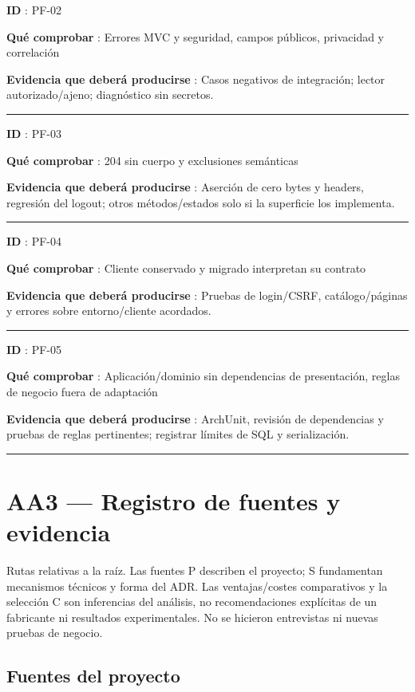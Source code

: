 \documentclass[12pt,a4paper]{report}
\begin{document}
\textbf{ID }: PF-02

\textbf{Qué comprobar }: Errores MVC y seguridad, campos públicos,
privacidad y correlación

\textbf{Evidencia que deberá producirse }: Casos negativos de
integración; lector autorizado/ajeno; diagnóstico sin secretos.

\medskip\hrule\medskip

\textbf{ID }: PF-03

\textbf{Qué comprobar }: 204 sin cuerpo y exclusiones semánticas

\textbf{Evidencia que deberá producirse }: Aserción de cero bytes y
headers, regresión del logout; otros métodos/estados solo si la
superficie los implementa.

\medskip\hrule\medskip

\textbf{ID }: PF-04

\textbf{Qué comprobar }: Cliente conservado y migrado interpretan su
contrato

\textbf{Evidencia que deberá producirse }: Pruebas de login/CSRF,
catálogo/páginas y errores sobre entorno/cliente acordados.

\medskip\hrule\medskip

\textbf{ID }: PF-05

\textbf{Qué comprobar }: Aplicación/dominio sin dependencias de
presentación, reglas de negocio fuera de adaptación

\textbf{Evidencia que deberá producirse }: ArchUnit, revisión de
dependencias y pruebas de reglas pertinentes; registrar límites de SQL y
serialización.

\medskip\hrule\medskip


\chapter{AA3 --- Registro de fuentes y
evidencia}\label{fuentes-aa3--registro-de-fuentes-y-evidencia}

Rutas relativas a la raíz. Las fuentes P describen el proyecto; S
fundamentan mecanismos técnicos y forma del ADR. Las ventajas/costes
comparativos y la selección C son inferencias del análisis, no
recomendaciones explícitas de un fabricante ni resultados
experimentales. No se hicieron entrevistas ni nuevas pruebas de negocio.

\section{Fuentes del proyecto}\label{fuentes-fuentes-del-proyecto}
\end{document}

